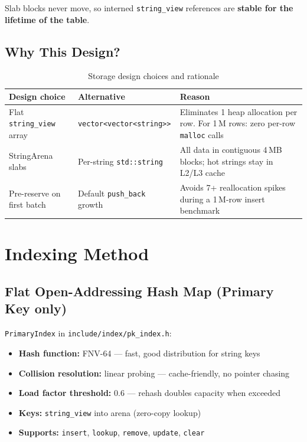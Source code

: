 \documentclass[12pt,a4paper]{article}
\begin{document}
\noindent Slab blocks never move, so interned \texttt{string\_view} references are \textbf{stable
for the lifetime of the table}.

\subsection{Why This Design?}

\begin{table}[H]
\centering
\begin{tabularx}{\textwidth}{L{3.5cm} L{3.5cm} X}
\toprule
\textbf{Design choice} & \textbf{Alternative} & \textbf{Reason} \\
\midrule
Flat \texttt{string\_view} array & \texttt{vector<vector<string>>} &
  Eliminates 1 heap allocation per row. For 1\,M rows: zero per-row \texttt{malloc} calls \\
\addlinespace
StringArena slabs & Per-string \texttt{std::string} &
  All data in contiguous 4\,MB blocks; hot strings stay in L2/L3 cache \\
\addlinespace
Pre-reserve on first batch & Default \texttt{push\_back} growth &
  Avoids 7+ reallocation spikes during a 1\,M-row insert benchmark \\
\bottomrule
\end{tabularx}
\caption{Storage design choices and rationale}
\end{table}

\section{Indexing Method}

\subsection{Flat Open-Addressing Hash Map (Primary Key only)}

\texttt{PrimaryIndex} in \texttt{include/index/pk\_index.h}:

\begin{itemize}[noitemsep]
  \item \textbf{Hash function:} FNV-64 — fast, good distribution for string keys
  \item \textbf{Collision resolution:} linear probing — cache-friendly, no pointer chasing
  \item \textbf{Load factor threshold:} 0.6 — rehash doubles capacity when exceeded
  \item \textbf{Keys:} \texttt{string\_view} into arena (zero-copy lookup)
  \item \textbf{Supports:} \texttt{insert}, \texttt{lookup}, \texttt{remove}, \texttt{update}, \texttt{clear}
\end{itemize}
\end{document}
